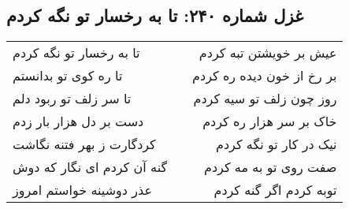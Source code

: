 \begin{center}
\section*{غزل شماره ۲۴۰: تا به رخسار تو نگه کردم}
\label{sec:240}
\begin{longtable}{l p{0.5cm} r}
تا به رخسار تو نگه کردم
&&
عیش بر خویشتن تبه کردم
\\
تا ره کوی تو بدانستم
&&
بر رخ از خون دیده ره کردم
\\
تا سر زلف تو ربود دلم
&&
روز چون زلف تو سیه کردم
\\
دست بر دل هزار بار زدم
&&
خاک بر سر هزار ره کردم
\\
کردگارت ز بهر فتنه نگاشت
&&
نیک در کار تو نگه کردم
\\
گنه آن کردم ای نگار که دوش
&&
صفت روی تو به مه کردم
\\
عذر دوشینه خواستم امروز
&&
توبه کردم اگر گنه کردم
\\
\end{longtable}
\end{center}
